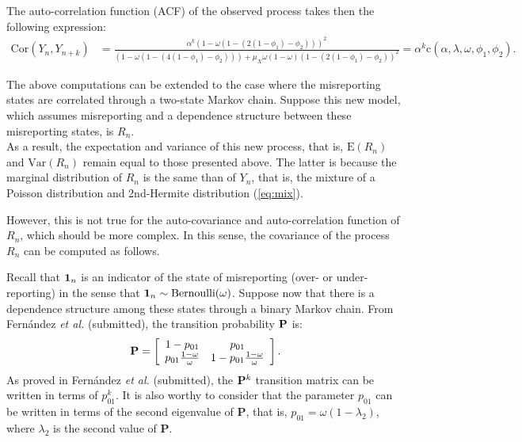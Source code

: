 \documentclass[11pt,a4paper]{article}
\begin{document}
\medskip

\noindent The auto-correlation function (ACF) of the observed process takes then the following expression:
\begin{align*}
\textrm{Cor}\left(Y_n,Y_{n+k}\right)&=\frac{\alpha^k(1-\omega(1-\left(2(1-\phi_1)-\phi_2\right)))^2}{\left(1-\omega\left(1-\left(4\left(1-\phi_1\right)-\phi_2\right)\right)\right)+\mu_X\omega(1-\omega)\left(1-\left(2\left(1-\phi_1\right)-\phi_2\right)\right)^2}=\alpha^k \textrm{c}(\alpha,\lambda,\omega,\phi_1,\phi_2).
\end{align*}

\medskip

\noindent The above computations can be extended to the case where the misreporting states are correlated through a two-state Markov chain. Suppose this new model, which assumes misreporting and a dependence structure between these misreporting states, is $R_n$. \\ As a result, the expectation and variance of this new process, that is, $\textrm{E}(R_n)$ and $\textrm{Var}(R_n)$ remain equal to those presented above. The latter is because the marginal distribution of $R_n$ is the same than of $Y_n$, that is, the mixture of a Poisson distribution and 2nd-Hermite distribution (\ref{eq:mix}). 

\medskip

\noindent However, this is not true for the auto-covariance and auto-correlation function of $R_n$, which should be more complex. In this sense, the covariance of the process $R_n$ can be computed as follows. 

\medskip

\noindent Recall that ${\bf 1}_n$ is an indicator of the state of misreporting (over- or under-reporting) in the sense that ${\bf 1}_n \sim \textrm{Bernoulli}(\omega)$. Suppose now that there is a dependence structure among these states through a binary Markov chain. From Fern\'andez {\it et al.} (submitted), the transition probability ${\bf P}$ is: 
 \[
   {\bf P}=
  \left[ {\begin{array}{cc}
   1-p_{01} & p_{01} \\
   p_{01}\frac{1-\omega}{\omega} & 1-p_{01}\frac{1-\omega}{\omega} \\
  \end{array} } \right]. 
\]
As proved in Fern\'andez {\it et al.} (submitted), the ${\bf P}^k$ transition matrix can be written in terms of $p_{01}^k$. It is also worthy to consider that the parameter $p_{01}$ can be written in terms of the second eigenvalue of {\bf P}, that is, $p_{01}=\omega(1-\lambda_2)$, where $\lambda_2$ is the second value of {\bf P}. 
\end{document}
